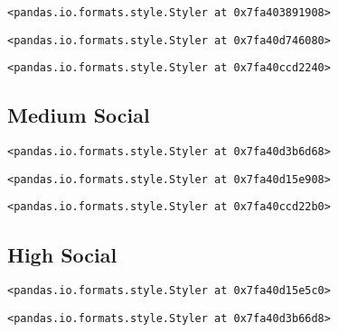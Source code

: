 \documentclass[11pt]{article}
\begin{document}
    
    
    \begin{verbatim}
<pandas.io.formats.style.Styler at 0x7fa403891908>
    \end{verbatim}

    
    
    \begin{verbatim}
<pandas.io.formats.style.Styler at 0x7fa40d746080>
    \end{verbatim}

    
    
    \begin{verbatim}
<pandas.io.formats.style.Styler at 0x7fa40ccd2240>
    \end{verbatim}

    
    \hypertarget{medium-social}{%
\subsection{\texorpdfstring{\textbf{Medium
Social}}{Medium Social}}\label{medium-social}}

    
    
    \begin{verbatim}
<pandas.io.formats.style.Styler at 0x7fa40d3b6d68>
    \end{verbatim}

    
    
    \begin{verbatim}
<pandas.io.formats.style.Styler at 0x7fa40d15e908>
    \end{verbatim}

    
    
    \begin{verbatim}
<pandas.io.formats.style.Styler at 0x7fa40ccd22b0>
    \end{verbatim}

    
    \hypertarget{high-social}{%
\subsection{\texorpdfstring{\textbf{High
Social}}{High Social}}\label{high-social}}

    
    
    \begin{verbatim}
<pandas.io.formats.style.Styler at 0x7fa40d15e5c0>
    \end{verbatim}

    
    
    \begin{verbatim}
<pandas.io.formats.style.Styler at 0x7fa40d3b66d8>
    \end{verbatim}
\end{document}
